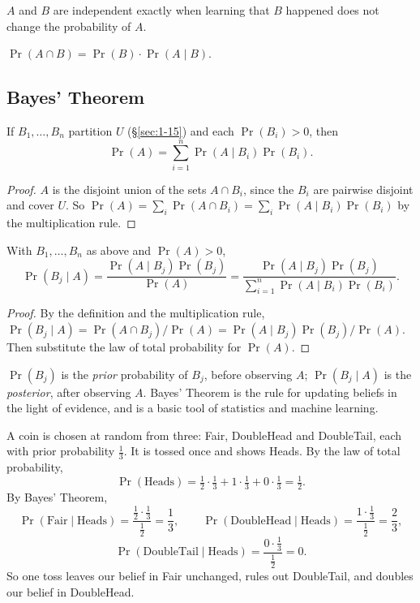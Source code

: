\begin{note}[Meaning]
$A$ and $B$ are independent exactly when learning that $B$ happened does not change the probability of $A$.
\end{note}

\begin{proposition}
$\Pr(A\cap B) = \Pr(B)\cdot\Pr(A\mid B)$.
\end{proposition}

\subsection{Bayes' Theorem}
\label{sec:9-9}

\begin{theorem}
If $B_1,\dots,B_n$ partition $U$ (\S\ref{sec:1-15}) and each $\Pr(B_i)>0$, then
\[
\Pr(A) = \sum_{i=1}^n \Pr(A\mid B_i)\Pr(B_i).
\]
\end{theorem}
\begin{proof}
$A$ is the disjoint union of the sets $A\cap B_i$, since the $B_i$ are pairwise disjoint and cover $U$. So $\Pr(A)=\sum_i\Pr(A\cap B_i)=\sum_i\Pr(A\mid B_i)\Pr(B_i)$ by the multiplication rule.
\end{proof}

\begin{theorem}
With $B_1,\dots,B_n$ as above and $\Pr(A)>0$,
\[
\Pr(B_j\mid A) = \frac{\Pr(A\mid B_j)\Pr(B_j)}{\Pr(A)} = \frac{\Pr(A\mid B_j)\Pr(B_j)}{\sum_{i=1}^n \Pr(A\mid B_i)\Pr(B_i)}.
\]
\end{theorem}
\begin{proof}
By the definition and the multiplication rule, $\Pr(B_j\mid A) = \Pr(A\cap B_j)/\Pr(A) = \Pr(A\mid B_j)\Pr(B_j)/\Pr(A)$. Then substitute the law of total probability for $\Pr(A)$.
\end{proof}

\begin{note}
$\Pr(B_j)$ is the \emph{prior} probability of $B_j$, before observing $A$; $\Pr(B_j\mid A)$ is the \emph{posterior}, after observing $A$. Bayes' Theorem is the rule for updating beliefs in the light of evidence, and is a basic tool of statistics and machine learning.
\end{note}

\begin{example}
A coin is chosen at random from three: Fair, DoubleHead and DoubleTail, each with prior probability $\frac13$. It is tossed once and shows Heads. By the law of total probability,
\[
\Pr(\text{Heads})=\tfrac12\cdot\tfrac13+1\cdot\tfrac13+0\cdot\tfrac13=\tfrac12.
\]
By Bayes' Theorem,
\[
\Pr(\text{Fair}\mid\text{Heads})=\frac{\frac12\cdot\frac13}{\frac12}=\frac13,\qquad
\Pr(\text{DoubleHead}\mid\text{Heads})=\frac{1\cdot\frac13}{\frac12}=\frac23,
\]
\[
\Pr(\text{DoubleTail}\mid\text{Heads})=\frac{0\cdot\frac13}{\frac12}=0.
\]
So one toss leaves our belief in Fair unchanged, rules out DoubleTail, and doubles our belief in DoubleHead.
\end{example}

